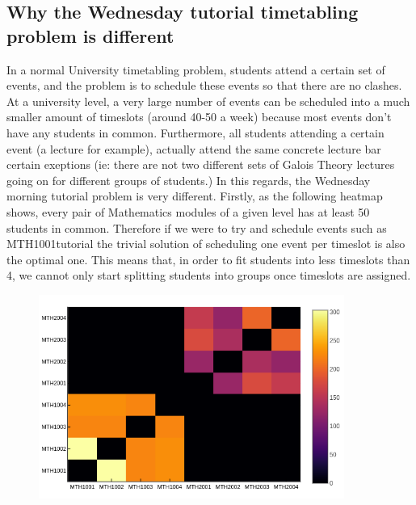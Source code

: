 \documentclass[12pt]{report}
\begin{document}
  \subsection{Why the Wednesday tutorial timetabling problem is different}
  In a normal University timetabling problem, students attend a certain set of
  events, and the problem is to schedule these events so that there are no
  clashes. At a university level, a very large number of events can be scheduled
  into a much smaller amount of timeslots (around 40-50 a week) because most
  events don't have any students in common. Furthermore, all students attending
  a certain event (a lecture for example), actually attend the same concrete
  lecture bar certain exeptions (ie: there are not two different sets of Galois
  Theory lectures going on for different groups of students.) In this regards, the Wednesday
  morning tutorial problem is very different. Firstly, as the following heatmap
  shows, every pair of Mathematics modules of a given level has at least 50
  students in common. Therefore if we were to try and schedule events such as
  MTH1001tutorial the trivial solution of scheduling one event per
  timeslot is also the optimal one. This means that, in order to fit students
  into less timeslots than 4, we cannot only start splitting students into
  groups once timeslots are assigned.
  \begin{figure}
    \includegraphics[width=100mm]{module-clashes}
  \end{figure}
\end{document}
